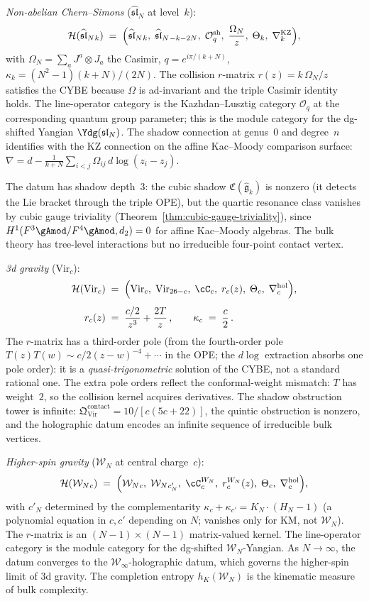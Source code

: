 \medskip\noindent
\emph{Non-abelian Chern--Simons}
($\widehat{\mathfrak{sl}}_N$ at level~$k$):
\[
\mathcal H(\widehat{\mathfrak{sl}}_N{}_k)
\;=\;
\Bigl(
\widehat{\mathfrak{sl}}_N{}_k,\;
\widehat{\mathfrak{sl}}_N{}_{-k-2N},\;
\mathcal O_q^{\mathrm{sh}},\;
\frac{\Omega_N}{z},\;
\Theta_k,\;
\nabla^{\mathrm{KZ}}_k
\Bigr),
\]
with $\Omega_N=\sum_a J^a\otimes J_a$ the Casimir,
$q=e^{i\pi/(k+N)}$, $\kappa_k=(N^2-1)(k+N)/(2N)$. The collision $r$-matrix $r(z)=k\,\Omega_N/z$ satisfies
the CYBE because $\Omega$ is ad-invariant and the triple Casimir
identity holds. The line-operator category is the
Kazhdan--Lusztig category $\mathcal O_q$ at the corresponding
quantum group parameter; this is the module category for the
dg-shifted Yangian $\Ydg(\mathfrak{sl}_N)$. The shadow
connection at genus~$0$ and degree~$n$ identifies with the KZ
connection on the affine Kac--Moody comparison surface:
$\nabla=d-\frac{1}{k+N}\sum_{i<j}\Omega_{ij}\,d\log(z_i-z_j)$.

The datum has shadow depth~$3$: the cubic shadow
$\mathfrak C(\widehat{\mathfrak g}_k)$ is nonzero (it detects
the Lie bracket through the triple OPE), but the quartic
resonance class vanishes by cubic gauge triviality
(Theorem~\ref{thm:cubic-gauge-triviality}), since
$H^1(F^3\gAmod/F^4\gAmod,d_2)=0$ for affine Kac--Moody
algebras. The bulk theory has tree-level interactions but no
irreducible four-point contact vertex.

\medskip\noindent
\emph{3d gravity}
($\mathrm{Vir}_c$):
\begin{align*}
\mathcal H(\mathrm{Vir}_c)
&\;=\;
\Bigl(
\mathrm{Vir}_c,\;
\mathrm{Vir}_{26-c},\;
\cC_c,\;
r_c(z),\;
\Theta_c,\;
\nabla^{\mathrm{hol}}_c
\Bigr),\\[4pt]
r_c(z)
&\;=\;
\frac{c/2}{z^3}+\frac{2T}{z}\,,
\qquad
\kappa_c\;=\;\frac{c}{2}\,.
\end{align*}
The $r$-matrix has a third-order pole (from the fourth-order pole
$T(z)T(w)\sim c/2(z-w)^{-4}+\cdots$ in the OPE; the
$d\log$ extraction absorbs one pole order): it is a
\emph{quasi-trigonometric} solution of the CYBE, not a standard
rational one. The extra pole orders reflect the conformal-weight
mismatch: $T$ has weight~$2$, so the collision kernel acquires
derivatives. The shadow obstruction tower is infinite:
$\mathfrak Q^{\mathrm{contact}}_{\mathrm{Vir}}
=10/[c(5c+22)]$, the quintic obstruction is nonzero,
and the holographic datum encodes an infinite sequence of
irreducible bulk vertices.

\medskip\noindent
\emph{Higher-spin gravity}
($\mathcal W_N$ at central charge~$c$):
\[
\mathcal H(\mathcal W_N{}_c)
\;=\;
\Bigl(
\mathcal W_N{}_c,\;
\mathcal W_N{}_{c'_N},\;
\cC_c^{W_N},\;
r_c^{W_N}(z),\;
\Theta_c,\;
\nabla^{\mathrm{hol}}_c
\Bigr),
\]
with $c'_N$ determined by the complementarity
$\kappa_c+\kappa_{c'}=K_N\cdot(H_N-1)$ (a polynomial equation in $c,c'$
depending on $N$; vanishes only for KM, not $\mathcal W_N$). The $r$-matrix is an
$(N-1)\times(N-1)$ matrix-valued kernel. The line-operator
category is the module category for the dg-shifted
$\mathcal W_N$-Yangian. As $N\to\infty$, the datum converges to
the $\mathcal W_\infty$-holographic datum, which governs the
higher-spin limit of 3d gravity. The completion entropy
$h_K(\mathcal W_N)$ is the kinematic measure of bulk complexity.

